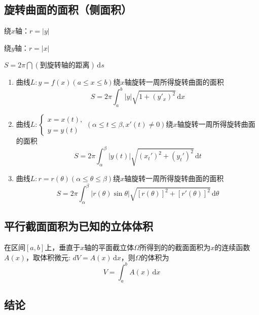 \documentclass[../book.tex]{subfiles}
\begin{document}
    \subsection{旋转曲面的面积（侧面积）}

    {\color{customgreen}{旋转曲面的侧面积 = 圆周长($2\pi r$) × 微元弧长}}
    \begin{circlenum}
        \item 绕$x$轴：$r = |y|$
        \item 绕$y$轴：$r = |x|$
        \item $S=2\pi\dint(\text{到旋转轴的距离})\,\mathrm{d}s$
    \end{circlenum}

    \begin{enumerate}
        \item 曲线$L: y = f(x)(a \leq x \leq b)$绕$x$轴旋转一周所得旋转曲面的面积
        \[
            S = 2\pi\int_a^b |y|\sqrt {1 + (y'_x)^2}\,\mathrm{d}x
        \]
        \item 曲线$L: \begin{cases}
                          x = x(t), \\
                          y = y(t)
        \end{cases}(\alpha \leq t \leq \beta, x'(t) \neq 0)$绕$x$轴旋转一周所得旋转曲面的面积
        \[
            S = 2\pi\int_{\alpha}^{\beta} |y(t)|\sqrt {(x_t')^2 + (y_t')^2}\,\mathrm{d}t
        \]
        \item 曲线$L: r = r(\theta)(\alpha \leq \theta \leq \beta)$绕$x$轴旋转一周所得旋转曲面的面积
        \[
            S = 2\pi\int_{\alpha}^{\beta} |r(\theta)\sin \theta|\sqrt {[r(\theta)]^2 + [r'(\theta)]^2}\,\mathrm{d}\theta
        \]
    \end{enumerate}

    \subsection{平行截面面积为已知的立体体积}

    在区间$[a, b]$上，垂直于$x$轴的平面截立体$\Omega$所得到的的截面面积为$x$的连续函数$A(x)$，取体积微元: $dV = A(x)\,\mathrm{d}x$，则$\Omega$的体积为
    \[
        V = \int_a^b A(x)\,\mathrm{d}x
    \]

    \subsection{结论}
\end{document}
